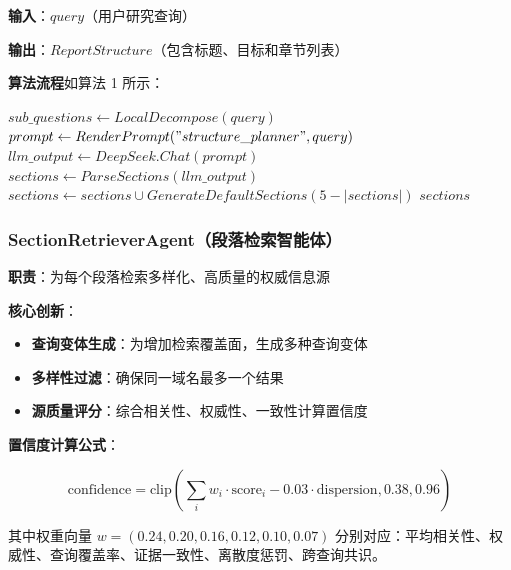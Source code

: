 \documentclass[12pt,a4paper]{article}
\begin{document}
\textbf{输入}：$query$（用户研究查询）

\textbf{输出}：$ReportStructure$（包含标题、目标和章节列表）

\textbf{算法流程}如算法 1 所示：

\begin{algorithm}[htbp]
\caption{Structure Planning}
\begin{algorithmic}[1]
    \State $sub\_questions \gets LocalDecompose(query)$
    \State $prompt \gets RenderPrompt("structure\_planner", query)$
    \State $llm\_output \gets DeepSeek.Chat(prompt)$
    \State $sections \gets ParseSections(llm\_output)$
        \State $sections \gets sections \cup GenerateDefaultSections(5 - |sections|)$
    \EndIf
    \State \Return $sections$
\EndFunction
\end{algorithmic}
\end{algorithm}

\subsubsection{SectionRetrieverAgent（段落检索智能体）}
\textbf{职责}：为每个段落检索多样化、高质量的权威信息源

\textbf{核心创新}：
\begin{itemize}
    \item \textbf{查询变体生成}：为增加检索覆盖面，生成多种查询变体
    \item \textbf{多样性过滤}：确保同一域名最多一个结果
    \item \textbf{源质量评分}：综合相关性、权威性、一致性计算置信度
\end{itemize}

\textbf{置信度计算公式}：

\begin{equation}
\text{confidence} = \text{clip}\left( \sum_{i} w_i \cdot \text{score}_i - 0.03 \cdot \text{dispersion}, 0.38, 0.96 \right)
\end{equation}

其中权重向量 $w = (0.24, 0.20, 0.16, 0.12, 0.10, 0.07)$ 分别对应：平均相关性、权威性、查询覆盖率、证据一致性、离散度惩罚、跨查询共识。
\end{document}
